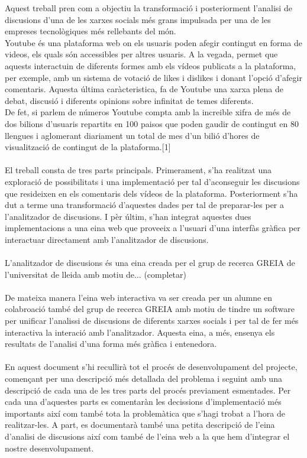 
Aquest treball pren com a objectiu la transformació 
i posteriorment l'analisi de discusions d'una de les 
xarxes socials més grans impulsada per una de les empreses 
tecnològiques més rellebants del món.\\
Youtube és una plataforma web on els usuaris poden afegir
contingut en forma de videos, els quals són accessibles per 
altres usuaris. A la vegada, permet que aquests 
interactuin de diferents formes amb els vídeos publicats
a la plataforma, per exemple, amb un sistema de votació 
de likes i dislikes i donant l'opció d'afegir comentaris.
Aquesta última caràcteristica, fa de Youtube una xarxa plena
de debat, discusió i diferents opinions sobre infinitat de 
temes diferents.\\
De fet, si parlem de números Youtube compta amb la increible 
xifra de més de dos bilions d'usuaris repartits en 100 paisos 
que poden gaudir de contingut en 80 llengues i aglomerant diariament 
un total de mes d'un bilió d'hores de visualització de contingut 
de la plataforma.[1]\\\\
%
El treball consta de tres parts principals. Primerament,
s'ha realitzat una exploració de possibilitats i una implementació per 
tal d'aconseguir les discusions que resideixen en els comentaris 
dels vídeos de la plataforma. Posteriorment s'ha dut a terme una transformació
d'aquestes dades per tal de preparar-les per a l'analitzador de discusions.
I pèr últim, s'han integrat aquestes dues implementacions a una eina web
que proveeix a l'usuari d'una interfàs gràfica per interactuar 
directament amb l'analitzador de discusions.\\\\
%
L'analitzador de discusions és una eina creada per el grup de recerca GREIA
de l'universitat de lleida amb motiu de... (completar)\\\\
%
De mateixa manera l'eina web interactiva va ser creada per un alumne en 
colabroació també del grup de recerca GREIA amb motiu de tindre un software 
per unificar l'analissi de discusions de diferents xarxes socials i per tal 
de fer més interactiva la interació amb l'analitzador. Aquesta eina, a més, 
ensenya els resultats de l'analisi d'una forma més gràfica i entenedora. \\\\
%
En aquest document s'hi recullirà tot el procés de desenvolupament
del projecte, començant per una descripció més detallada del problema
i seguint amb una descripció de cada una de les tres parts del procés previament 
esmentades. Per cada una d'aquestes parts es comentaràn  les decissions 
d'implementació més importants així com també tota la problemàtica que 
s'hagi trobat a l'hora de realitzar-les. A part, es documentarà també una 
petita descripció de l'eina d'analisi de discusions així com també de 
l'eina web a la que hem d'integrar el nostre desenvolupament. 
